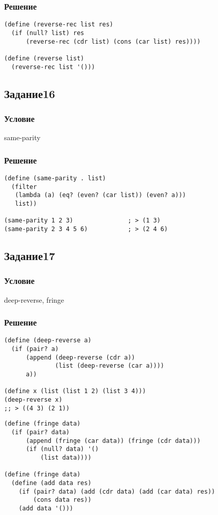 \documentclass[10pt,a4paper]{article}
\begin{document}
\subsubsection*{Решение}

\begin{lstlisting}
(define (reverse-rec list res)
  (if (null? list) res
      (reverse-rec (cdr list) (cons (car list) res))))

(define (reverse list)
  (reverse-rec list '()))
\end{lstlisting}

\subsection*{Задание16}
\subsubsection*{Условие}
same-parity
\subsubsection*{Решение}
\begin{lstlisting}
(define (same-parity . list)
  (filter
   (lambda (a) (eq? (even? (car list)) (even? a)))
   list))

(same-parity 1 2 3)               ; > (1 3)
(same-parity 2 3 4 5 6)           ; > (2 4 6)
\end{lstlisting}

\subsection*{Задание17}
\subsubsection*{Условие}
deep-reverse, fringe
\subsubsection*{Решение}
\begin{lstlisting}
(define (deep-reverse a)
  (if (pair? a)
      (append (deep-reverse (cdr a))
              (list (deep-reverse (car a))))
      a))

(define x (list (list 1 2) (list 3 4)))
(deep-reverse x)
;; > ((4 3) (2 1))
\end{lstlisting}
\begin{lstlisting}
(define (fringe data)
  (if (pair? data)
      (append (fringe (car data)) (fringe (cdr data)))
      (if (null? data) '()
          (list data))))

(define (fringe data)
  (define (add data res)
    (if (pair? data) (add (cdr data) (add (car data) res))
        (cons data res))
    (add data '()))
\end{lstlisting}
\end{document}
